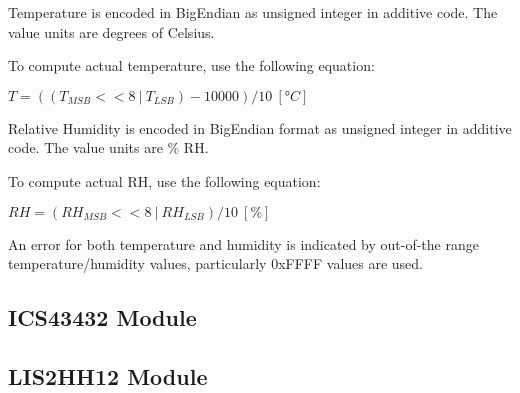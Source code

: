   Temperature is encoded in BigEndian as unsigned integer in additive code. The value units are degrees of Celsius.
  
  To compute actual temperature, use the following equation:
  
  $T = ((T_{MSB} << 8 ~|~ T_{LSB}) - 10000) / 10 ~[°C]$
  
  Relative Humidity is encoded in BigEndian format as unsigned integer in additive code. The value units are \% RH.
  
  To compute actual RH, use the following equation:
  
  $RH = (RH_{MSB} << 8 ~|~ RH_{LSB}) / 10 ~[\%]$
  
  An error for both temperature and humidity is indicated by out-of-the range temperature/humidity values, particularly 0xFFFF values are used.
  

\clearpage
\subsection{ICS43432 Module}



\clearpage
\subsection{LIS2HH12 Module}

  
  




  




